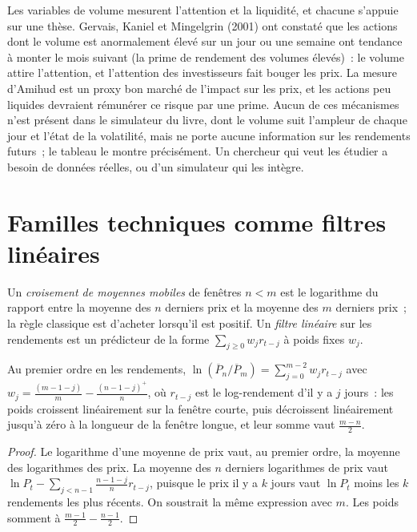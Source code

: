 Les variables de volume mesurent l'attention et la liquidité, et chacune s'appuie sur une thèse. Gervais, Kaniel et Mingelgrin (2001) ont constaté que
les actions dont le volume est anormalement élevé sur un jour ou une semaine ont tendance à monter le mois suivant (la prime de rendement des volumes élevés)~: le volume
attire l'attention, et l'attention des investisseurs fait bouger les prix. La mesure d'Amihud est un proxy bon marché de l'impact sur les prix, et les actions peu liquides
devraient rémunérer ce risque par une prime. Aucun de ces mécanismes n'est présent dans le simulateur du livre, dont le volume suit l'ampleur de chaque
jour et l'état de la volatilité, mais ne porte aucune information sur les rendements futurs~; le tableau le montre précisément. Un chercheur qui
veut les étudier a besoin de données réelles, ou d'un simulateur qui les intègre.

\section{Familles techniques comme filtres linéaires}

\begin{definition}\label{def:rs:price-and-volume-features:filter}
Un \emph{croisement de moyennes mobiles} de fenêtres $n < m$ est le logarithme du rapport entre la moyenne
des $n$ derniers prix et la moyenne des $m$ derniers prix~; la règle classique est d'acheter lorsqu'il est positif. Un \emph{filtre
linéaire} sur les rendements est un prédicteur de la forme $\sum_{j \ge 0} w_jr_{t-j}$ à poids fixes $w_j$.
\end{definition}

\begin{proposition}\label{prop:rs:price-and-volume-features:crossover}
Au premier ordre en les rendements, $\ln(\overline P_n/\overline P_m) = \sum_{j=0}^{m-2} w_jr_{t-j}$ avec $w_j = \frac{(m - 1 - j)}{m} -
\frac{(n - 1 - j)^+}{n}$, où $r_{t-j}$ est le log-rendement d'il y a $j$ jours~: les poids croissent linéairement sur la fenêtre courte, puis décroissent
linéairement jusqu'à zéro à la longueur de la fenêtre longue, et leur somme vaut $\frac{m - n}{2}$.
\end{proposition}

\begin{proof}
Le logarithme d'une moyenne de prix vaut, au premier ordre, la moyenne des logarithmes des prix. La moyenne des $n$ derniers logarithmes de prix vaut $\ln P_t
- \sum_{j<n-1}\frac{n-1-j}{n}r_{t-j}$, puisque le prix il y a $k$ jours vaut $\ln P_t$ moins les $k$ rendements les plus récents. On soustrait la
même expression avec $m$. Les poids somment à $\frac{m-1}{2} - \frac{n-1}{2}$.
\end{proof}

